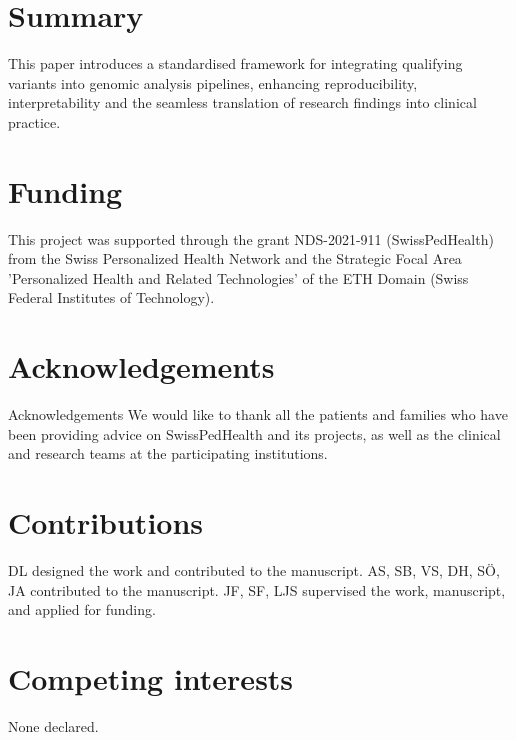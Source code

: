 \section{Summary}
This paper introduces a standardised framework for integrating qualifying variants into genomic analysis pipelines, enhancing reproducibility, interpretability and the seamless translation of research findings into clinical practice.

\section{Funding}
This project was supported through the grant NDS-2021-911 (SwissPedHealth) from the Swiss Personalized Health Network and the Strategic Focal Area 'Personalized Health and Related Technologies' of the ETH Domain (Swiss Federal Institutes of Technology).

\section{Acknowledgements}
Acknowledgements We would like to thank all the patients and families who have been providing advice on SwissPedHealth and its projects, as well as the clinical and research teams at the participating institutions.

\section{Contributions}
DL designed the work and contributed to the manuscript.
AS, SB, VS, DH, SÖ, JA contributed to the manuscript.
JF, SF, LJS supervised the work, manuscript, and applied for funding.

\section{Competing interests}
None declared.

